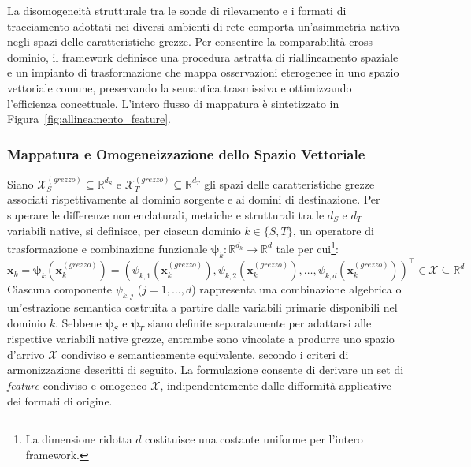 La disomogeneità strutturale tra le sonde di rilevamento e i formati di tracciamento adottati nei diversi ambienti di rete comporta un'asimmetria nativa negli spazi delle caratteristiche grezze. Per consentire la comparabilità cross-dominio, il framework definisce una procedura astratta di riallineamento spaziale e un impianto di trasformazione che mappa osservazioni eterogenee in uno spazio vettoriale comune, preservando la semantica trasmissiva e ottimizzando l'efficienza concettuale. L'intero flusso di mappatura è sintetizzato in Figura~\ref{fig:allineamento_feature}.

\subsubsection{Mappatura e Omogeneizzazione dello Spazio Vettoriale}
\label{subsubsec:mappatura_feature}
Siano $\mathcal{X}_S^{(grezzo)} \subseteq \mathbb{R}^{d_S}$ e $\mathcal{X}_T^{(grezzo)} \subseteq \mathbb{R}^{d_T}$ gli spazi delle caratteristiche grezze associati rispettivamente al dominio sorgente e ai domini di destinazione. Per superare le differenze nomenclaturali, metriche e strutturali tra le $d_S$ e $d_T$ variabili native, si definisce, per ciascun dominio $k \in \{S, T\}$, un operatore di trasformazione e combinazione funzionale $\boldsymbol{\psi}_k: \mathbb{R}^{d_k} \rightarrow \mathbb{R}^d$ tale per cui\footnote{La dimensione ridotta $d$ costituisce una costante uniforme per l'intero framework.}:
\begin{equation}
    \mathbf{x}_k = \boldsymbol{\psi}_k(\mathbf{x}_k^{(grezzo)}) = \left( \psi_{k,1}(\mathbf{x}_k^{(grezzo)}), \psi_{k,2}(\mathbf{x}_k^{(grezzo)}), \dots, \psi_{k,d}(\mathbf{x}_k^{(grezzo)}) \right)^\top \in \mathcal{X} \subseteq \mathbb{R}^d
    \label{eq:feature_mapping}
\end{equation}
Ciascuna componente $\psi_{k,j}$ ($j = 1, \dots, d$) rappresenta una combinazione algebrica o un'estrazione semantica costruita a partire dalle variabili primarie disponibili nel dominio $k$. Sebbene $\boldsymbol{\psi}_S$ e $\boldsymbol{\psi}_T$ siano definite separatamente per adattarsi alle rispettive variabili native grezze, entrambe sono vincolate a produrre uno spazio d'arrivo $\mathcal{X}$ condiviso e semanticamente equivalente, secondo i criteri di armonizzazione descritti di seguito. La formulazione consente di derivare un set di \textit{feature} condiviso e omogeneo $\mathcal{X}$, indipendentemente dalle difformità applicative dei formati di origine.

